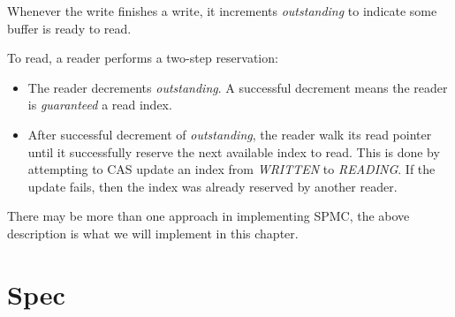 Whenever the write finishes a write, it increments \textit{outstanding} to
indicate some buffer is ready to read.\newline 

To read, a reader performs a two-step reservation: 
\begin{itemize}
    \item The reader decrements \textit{outstanding}. A successful decrement means
    the reader is \textit{guaranteed} a read index.
    \item After successful decrement of \textit{outstanding}, the reader walk
    its read pointer until it successfully reserve the next available index to
    read. This is done by attempting to CAS update an index from \textit{WRITTEN} to
    \textit{READING}. If the update fails, then the index was already reserved by another 
    reader.
\end{itemize}

There may be more than one approach in implementing SPMC, the above description
is what we will implement in this chapter.

\section{Spec}

